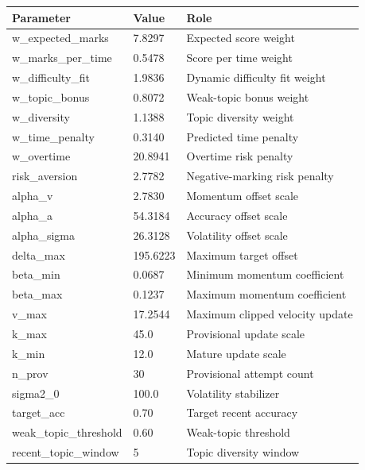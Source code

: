 \begin{tabular}{lll}
\toprule
Parameter & Value & Role \\
\midrule
w_expected_marks & 7.8297 & Expected score weight \\
w_marks_per_time & 0.5478 & Score per time weight \\
w_difficulty_fit & 1.9836 & Dynamic difficulty fit weight \\
w_topic_bonus & 0.8072 & Weak-topic bonus weight \\
w_diversity & 1.1388 & Topic diversity weight \\
w_time_penalty & 0.3140 & Predicted time penalty \\
w_overtime & 20.8941 & Overtime risk penalty \\
risk_aversion & 2.7782 & Negative-marking risk penalty \\
alpha_v & 2.7830 & Momentum offset scale \\
alpha_a & 54.3184 & Accuracy offset scale \\
alpha_sigma & 26.3128 & Volatility offset scale \\
delta_max & 195.6223 & Maximum target offset \\
beta_min & 0.0687 & Minimum momentum coefficient \\
beta_max & 0.1237 & Maximum momentum coefficient \\
v_max & 17.2544 & Maximum clipped velocity update \\
k_max & 45.0 & Provisional update scale \\
k_min & 12.0 & Mature update scale \\
n_prov & 30 & Provisional attempt count \\
sigma2_0 & 100.0 & Volatility stabilizer \\
target_acc & 0.70 & Target recent accuracy \\
weak_topic_threshold & 0.60 & Weak-topic threshold \\
recent_topic_window & 5 & Topic diversity window \\
\bottomrule
\end{tabular}
